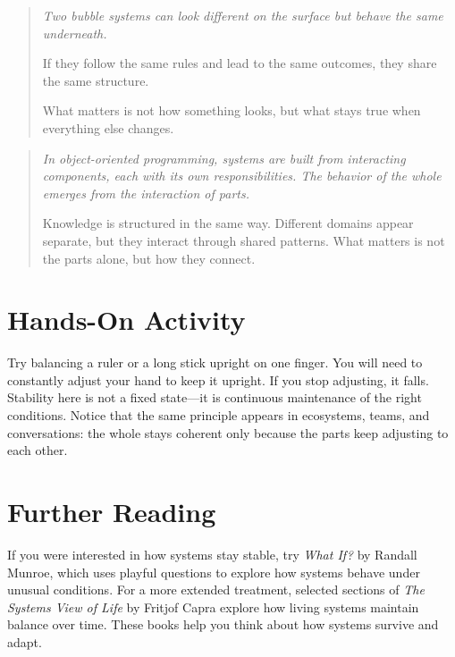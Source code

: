 \documentclass[11pt]{book}
\theoremstyle{definition}
\theoremstyle{remark}
\newenvironment{literaryaside}
  {\begin{quote}\small\itshape}
  {\end{quote}}
\newenvironment{spherepopjunior}
  {\begin{quote}\small\itshape}
  {\end{quote}}
\begin{document}
\begin{spherepopjunior}
Two bubble systems can look different on the surface but behave the
same underneath.

If they follow the same rules and lead to the same outcomes, they share
the same structure.

What matters is not how something looks, but what stays true when
everything else changes.
\end{spherepopjunior}

\begin{literaryaside}
In object-oriented programming, systems are built from interacting
components, each with its own responsibilities. The behavior of the
whole emerges from the interaction of parts.

Knowledge is structured in the same way. Different domains appear
separate, but they interact through shared patterns. What matters is
not the parts alone, but how they connect.
\end{literaryaside}

\section*{Hands-On Activity}

Try balancing a ruler or a long stick upright on one finger. You will
need to constantly adjust your hand to keep it upright. If you stop
adjusting, it falls. Stability here is not a fixed state---it is
continuous maintenance of the right conditions. Notice that the same
principle appears in ecosystems, teams, and conversations: the whole
stays coherent only because the parts keep adjusting to each other.

\section*{Further Reading}

If you were interested in how systems stay stable, try \textit{What
If?} by Randall Munroe, which uses playful questions to explore how
systems behave under unusual conditions. For a more extended treatment,
selected sections of \textit{The Systems View of Life} by Fritjof Capra
explore how living systems maintain balance over time. These books help
you think about how systems survive and adapt.
\end{document}
